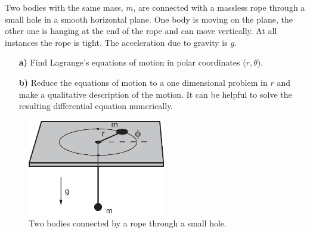 \documentclass[11pt,a4paper]{report}
\newcounter{excount}[chapter]
\newenvironment{exercise}[1][]{\addtocounter{excount}{1} \noindent {\bf Problem
    \arabic{excount} \ \ #1}\hspace{2mm}}{\vspace{4mm}}
\begin{document}
\begin{exercise}
Two bodies with the same mass, $m$, are connected with a massless rope through a small hole in a smooth horizontal plane. One body is moving on the plane, the other one is hanging at the end of the rope and can move vertically. At all instances
the rope is tight. The acceleration due to gravity is $g$.

\begin{itemize}
\item[\bf a)] Find Lagrange's equations of motion in polar coordinates ($r,\theta$). 
\item[\bf b)] Reduce the equations of motion to a one dimensional problem in $r$ 
and make a qualitative description of the motion. It can be helpful to solve the resulting differential equation numerically.
\end{itemize}

\begin{figure}[h!]
\begin{center}
\includegraphics[width=6cm]{KlossOgKule.eps}
\end{center}
\caption{Two bodies connected by a rope through a small hole.}
\end{figure}

\end{exercise}
\end{document}
